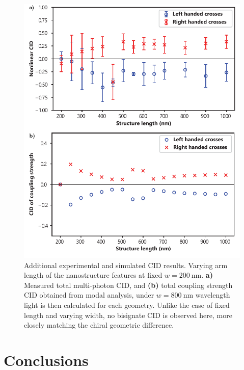 \begin{figure}[htb!]	
    \centering	
    \includegraphics[scale=1]{./figures/results/EnantiomorphingChiralCrosses/d200data.pdf}
    \caption{\label{fig:results:EnantiomorphingChiralCrosses:d200data}
    Additional experimental and simulated CID results. Varying arm length of the nanostructure features at fixed $w=\SI{200}{\nano\m}$. \textbf{a)} Measured total multi-photon CID, and \textbf{(b)} total coupling strength CID obtained from modal analysis, under $w=\SI{800}{\nano\m}$ wavelength light is then calculated for each geometry. Unlike the case of fixed length and varying width, no bisignate CID is observed here, more closely matching the chiral geometric difference.}
\end{figure}

\section{Conclusions}\label{sec:results:EnantiomorphingChiralCrosses:conclusions}

